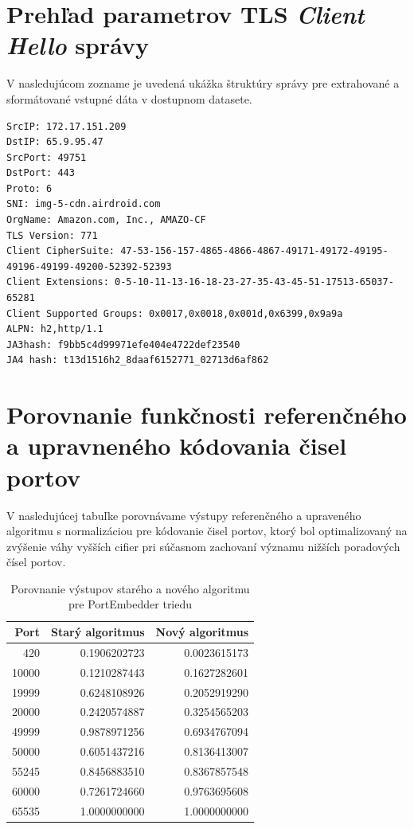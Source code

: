 \chapter{Prehľad parametrov TLS \textit{Client Hello} správy}
V nasledujúcom zozname je uvedená ukážka štruktúry správy pre extrahované a sformátované vstupné dáta v dostupnom datasete.
\begin{lstlisting}[caption={Ukážka extrahovaných parametrov pre aplikáciu AirDroid}, label={lst:tls_airdroid}]
SrcIP: 172.17.151.209
DstIP: 65.9.95.47
SrcPort: 49751
DstPort: 443
Proto: 6
SNI: img-5-cdn.airdroid.com
OrgName: Amazon.com, Inc., AMAZO-CF
TLS Version: 771
Client CipherSuite: 47-53-156-157-4865-4866-4867-49171-49172-49195-49196-49199-49200-52392-52393
Client Extensions: 0-5-10-11-13-16-18-23-27-35-43-45-51-17513-65037-65281
Client Supported Groups: 0x0017,0x0018,0x001d,0x6399,0x9a9a
ALPN: h2,http/1.1
JA3hash: f9bb5c4d99971efe404e4722def23540
JA4 hash: t13d1516h2_8daaf6152771_02713d6af862
\end{lstlisting}

\chapter{Porovnanie funkčnosti referenčného a upravneného kódovania čisel portov}
V nasledujúcej tabuľke porovnávame výstupy referenčného a upraveného algoritmu s normalizáciou pre kódovanie čisel portov, ktorý bol optimalizovaný na zvýšenie váhy vyšších cifier pri súčasnom zachovaní významu nižších poradových čísel portov.
\begin{table}[H]
    \centering
    \caption{Porovnanie výstupov starého a nového algoritmu pre PortEmbedder triedu}
    \label{tab:port_comparison}
    \begin{tabular}{@{}rrr@{}}
        \toprule
        \textbf{Port} & \textbf{Starý algoritmus} & \textbf{Nový algoritmus} \\ \midrule
        420   & 0.1906202723 & 0.0023615173 \\
        10000 & 0.1210287443 & 0.1627282601 \\
        19999 & 0.6248108926 & 0.2052919290 \\
        20000 & 0.2420574887 & 0.3254565203 \\
        49999 & 0.9878971256 & 0.6934767094 \\
        50000 & 0.6051437216 & 0.8136413007 \\
        55245 & 0.8456883510 & 0.8367857548 \\
        60000 & 0.7261724660 & 0.9763695608 \\
        65535 & 1.0000000000 & 1.0000000000 \\ \bottomrule
    \end{tabular}
\end{table}
\enlargethispage{\baselineskip}

